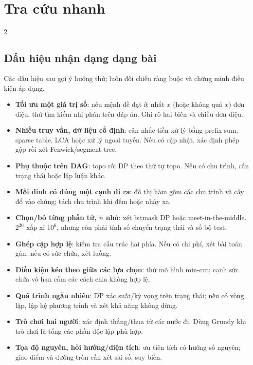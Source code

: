 \clearpage
\section{Tra cứu nhanh}
\begingroup\small
\begin{multicols}{2}
\subsection{Dấu hiệu nhận dạng dạng bài}
Các dấu hiệu sau gợi ý hướng thử; luôn đối chiếu ràng buộc và
chứng minh điều kiện áp dụng.
\begin{itemize}
\setlength{\itemsep}{2pt}
\item \textbf{Tối ưu một giá trị số}: nếu mệnh đề đạt ít nhất $x$
      (hoặc không quá $x$) đơn điệu, thử tìm kiếm nhị phân trên đáp án.
      Ghi rõ hai biên và chiều đơn điệu.
\item \textbf{Nhiều truy vấn, dữ liệu cố định}: cân nhắc tiền xử lý
      bằng prefix sum, sparse table, LCA hoặc xử lý ngoại tuyến.
      Nếu có cập nhật, xác định phép gộp rồi xét Fenwick/segment tree.
\item \textbf{Phụ thuộc trên DAG}: topo rồi DP theo thứ tự topo.
      Nếu có chu trình, cần trạng thái hoặc lập luận khác.
\item \textbf{Mỗi đỉnh có đúng một cạnh đi ra}: đồ thị hàm gồm các
      chu trình và cây đổ vào chúng; tách chu trình khi đếm hoặc nhảy xa.
\item \textbf{Chọn/bỏ từng phần tử, $n$ nhỏ}: xét bitmask DP hoặc
      meet-in-the-middle. $2^{20}$ xấp xỉ $10^6$, nhưng còn phải tính
      số chuyển trạng thái và số bộ test.
\item \textbf{Ghép cặp hợp lệ}: kiểm tra cấu trúc hai phía.
      Nếu có chi phí, xét bài toán gán; nếu có sức chứa, xét luồng.
\item \textbf{Điều kiện kéo theo giữa các lựa chọn}: thử mô hình min-cut;
      cạnh sức chứa vô hạn cấm các cách chia không hợp lệ.
\item \textbf{Quá trình ngẫu nhiên}: DP xác suất/kỳ vọng trên trạng thái;
      nếu có vòng lặp, lập hệ phương trình và xét khả năng không dừng.
\item \textbf{Trò chơi hai người}: xác định thắng/thua từ các nước đi.
      Dùng Grundy khi trò chơi là tổng các phần độc lập phù hợp.
\item \textbf{Tọa độ nguyên, hỏi hướng/diện tích}: ưu tiên tích có hướng
      số nguyên; giao điểm và đường tròn cần xét sai số, suy biến.
\end{itemize}


\end{multicols}
